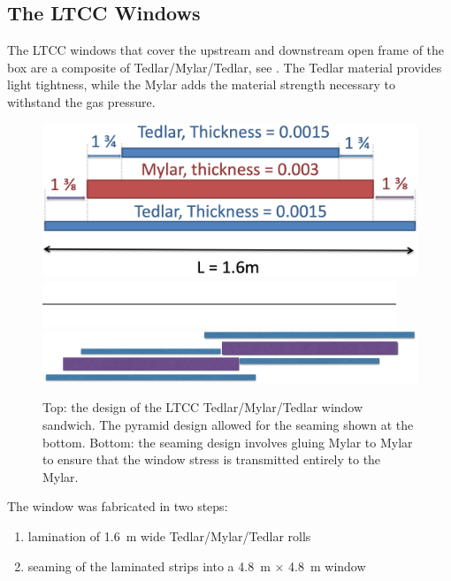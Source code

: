 \subsection{The LTCC Windows}

The LTCC windows that cover the upstream and downstream open frame of the box are a composite of
Tedlar/Mylar/Tedlar, see . The Tedlar material provides light tightness, while the Mylar adds the
material strength necessary to withstand the gas pressure.

\begin{figure}
	\centering
	\includegraphics[width=1.0\columnwidth, keepaspectratio]{img/windowDesign.png}
	\includegraphics[width=1.0\columnwidth, keepaspectratio]{img/blank.png}
	\includegraphics[width=1.0\columnwidth, keepaspectratio]{img/windowSeaming.png}
	\caption{Top: the design of the LTCC Tedlar/Mylar/Tedlar window sandwich. The pyramid design allowed for the
          seaming shown at the bottom. Bottom: the seaming design involves gluing Mylar to Mylar to ensure that the window
          stress is transmitted entirely to the Mylar.}
	\label{fig:windowDesign}
\end{figure}

The window was fabricated in two steps:

\begin{enumerate}
	\item lamination of 1.6~m wide Tedlar/Mylar/Tedlar rolls
	\item seaming of the laminated strips into a 4.8~m $\times$ 4.8~m window
\end{enumerate}


